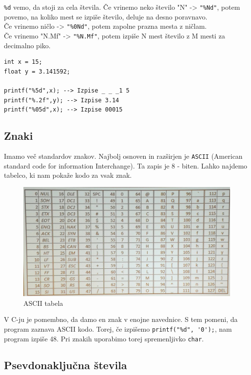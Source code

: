 \documentclass[a4paper, 12pt]{article}
\begin{document}
\texttt{\%d} vemo, da stoji za cela števila. Če vrinemo neko število "N" -> \texttt{"\%Nd"}, potem povemo, na koliko mest se izpiše število, deluje na desno poravnavo.\\
Če vrinemo ničlo -> \texttt{"\%0Nd"}, potem zapolne prazna mesta z ničlam.\\
Če vrinemo "N.Mf" -> \texttt{"\%N.Mf"}, potem izpiše N mest število z M mesti za decimalno piko.

\begin{lstlisting}
int x = 15;
float y = 3.141592;

printf("%5d",x); --> Izpise _ _ _1 5
printf("%.2f",y); --> Izpise 3.14
printf("%05d",x); --> Izpise 00015
\end{lstlisting} 

\subsection{Znaki}

Imamo več standardov znakov. Najbolj osnoven in razširjen je \texttt{ASCII} (American standard code for information Interchange). Ta zapis je 8 - biten. Lahko najdemo tabelco, ki nam pokaže kodo za vsak znak.


\begin{figure}[h!]
	\centering
	\includegraphics[width=0.8\linewidth]{images/ascii.jpg}
	\caption{ASCII tabela}
	\label{fig:ascii-tabela }
\end{figure}

V C-ju je pomembno, da damo en znak v enojne navednice. S tem pomeni, da program zaznava ASCII kodo. Torej, če izpišemo \lstinline|printf("%d", '0');|, nam program izpiše 48. Pri znakih uporabimo torej spremenljivko \lstinline|char|.

\subsection{Psevdonaključna števila}
\end{document}
